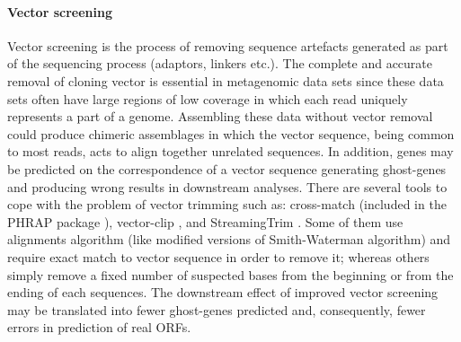 \paragraph{Vector screening}
Vector screening is the process of removing sequence artefacts generated as part of the sequencing process (adaptors, linkers etc.). The complete and accurate removal of cloning vector is essential in metagenomic data sets since these data sets often have large regions of low coverage in which each read uniquely represents a part of a genome. Assembling these data without vector removal could produce chimeric assemblages in which the vector sequence, being common to most reads, acts to align together unrelated sequences. In addition, genes may be predicted on the correspondence of a vector sequence generating ghost-genes and producing wrong results in downstream analyses. There are several tools to cope with the problem of vector trimming such as: cross-match (included in the PHRAP package \cite{bastide2007assembling}), vector-clip \cite{staden1999staden}, and StreamingTrim \cite{bacci2014streamingtrim}. Some of them use alignments algorithm (like modified versions of Smith-Waterman algorithm) and require exact match to vector sequence in order to remove it; whereas others simply remove a fixed number of suspected bases from the beginning or from the ending of each sequences. The downstream effect of improved vector screening may be translated into fewer ghost-genes predicted and, consequently, fewer errors in prediction of real ORFs.\\%

